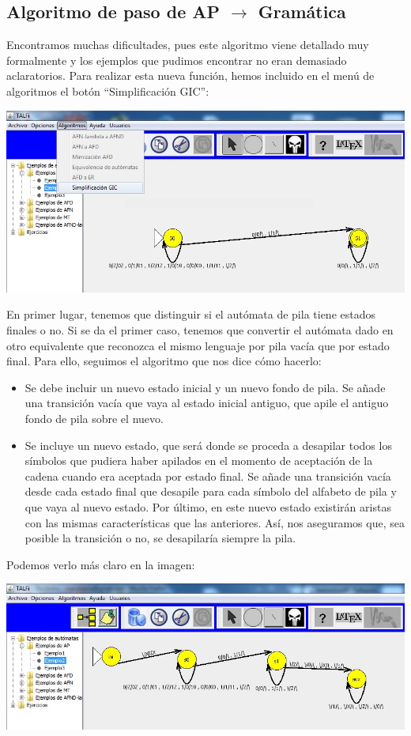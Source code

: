 \documentclass[12pt,a4paper,spanish]{book}
\begin{document}
\subsection{Algoritmo de paso de AP $\rightarrow$ Gram\'atica}
Encontramos muchas dificultades, pues este algoritmo viene detallado muy formalmente y los ejemplos que pudimos encontrar no eran demasiado aclaratorios.
Para realizar esta nueva funci\'on, hemos incluido en el men\'u de algoritmos el bot\'on ``Simplificaci\'on GIC'':\\
\begin{center}
\includegraphics[width=\textwidth]{auto4.jpg}
\end{center}
En primer lugar, tenemos que distinguir si el aut\'omata de pila tiene estados finales o no. Si se da el primer caso, tenemos que convertir el aut\'omata dado en otro equivalente que reconozca el mismo lenguaje por pila vac\'ia que por estado final. Para ello, seguimos el algoritmo que nos dice c\'omo hacerlo:
\begin{itemize}
\item Se debe incluir un nuevo estado inicial y un nuevo fondo de pila. Se a\~nade una transici\'on vac\'ia que vaya al estado inicial antiguo, que apile el antiguo fondo de pila sobre el nuevo.
\newpage
\item Se incluye un nuevo estado, que ser\'a donde se proceda a desapilar todos los s\'imbolos que pudiera haber apilados en el momento de aceptaci\'on de la cadena cuando era aceptada por estado final. Se a\~nade una transici\'on vac\'ia desde cada estado final que desapile para cada s\'imbolo del alfabeto de pila y que vaya al nuevo estado. Por \'ultimo, en este nuevo estado existir\'an aristas con las mismas caracter\'isticas que las anteriores. As\'i, nos aseguramos que, sea posible la transici\'on o no, se desapilar\'ia siempre la pila.\\
\end{itemize}
Podemos verlo m\'as claro en la imagen:\\
\begin{center}
\includegraphics[width=\textwidth]{roci1.jpg}
\end{center}
\end{document}
